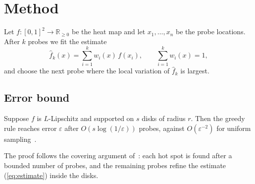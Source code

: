 \section{Method}\label{sec:method}
Let $f\colon [0,1]^2 \to \mathbb{R}_{\ge 0}$ be the heat map and let
$x_1,\dots,x_n$ be the probe locations. After $k$ probes we fit the estimate
\begin{equation}\label{eq:estimate}
  \hat f_k(x) = \sum_{i=1}^{k} w_i(x)\, f(x_i),
  \qquad \sum_{i=1}^{k} w_i(x) = 1,
\end{equation}
and choose the next probe where the local variation of $\hat f_k$ is largest.

\subsection{Error bound}\label{sec:bound}
Suppose $f$ is $L$-Lipschitz and supported on $s$ disks of radius $r$.
Then the greedy rule reaches error $\varepsilon$ after
$O\!\left(s \log(1/\varepsilon)\right)$ probes, against
$O\!\left(\varepsilon^{-2}\right)$ for uniform sampling~\cite{donoho2006}.

The proof follows the covering argument of~\cite{candes2006}: each hot spot is
found after a bounded number of probes, and the remaining probes refine the
estimate (\ref{eq:estimate}) inside the disks.
